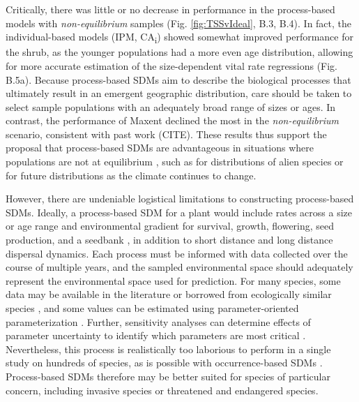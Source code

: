 \documentclass[preprint,review,times,12pt]{elsarticle}
\begin{document}
Critically, there was little or no decrease in performance in the process-based models with \emph{non-equilibrium} samples (Fig. \ref{fig:TSSvIdeal}, B.3, B.4). In fact, the individual-based models (IPM, CA\textsubscript{i}) showed somewhat improved performance for the shrub, as the younger populations had a more even age distribution, allowing for more accurate estimation of the size-dependent vital rate regressions (Fig. B.5a). Because process-based SDMs aim to describe the biological processes that ultimately result in an emergent geographic distribution, care should be taken to select sample populations with an adequately broad range of sizes or ages. In contrast, the performance of Maxent declined the most in the \emph{non-equilibrium} scenario, consistent with past work (CITE). These results thus support the proposal that process-based SDMs are advantageous in situations where populations are not at equilibrium \citep{Merow2011a,Evans2016,Merow2017,Cabral2017}, such as for distributions of alien species or for future distributions as the climate continues to change. 

However, there are undeniable logistical limitations to constructing process-based SDMs. Ideally, a process-based SDM for a plant would include rates across a size or age range and environmental gradient for survival, growth, flowering, seed production, and a seedbank \citep{Ellner2006,Merow2014a}, in addition to short distance and long distance dispersal dynamics. Each process must be informed with data collected over the course of multiple years, and the sampled environmental space should adequately represent the environmental space used for prediction. For many species, some data may be available in the literature or borrowed from ecologically similar species \citep{Merow2011a,Szewczyk2019}, and some values can be estimated using parameter-oriented parameterization \citep{Grimm2005,Merow2011a,Szewczyk2019}. Further, sensitivity analyses can determine effects of parameter uncertainty to identify which parameters are most critical \citep{Prowse2016,Aiello-Lammens2017}. Nevertheless, this process is realistically too laborious to perform in a single study on hundreds of species, as is possible with occurrence-based SDMs \citep{Allen2016}. Process-based SDMs therefore may be better suited for species of particular concern, including invasive species or threatened and endangered species.
\end{document}
